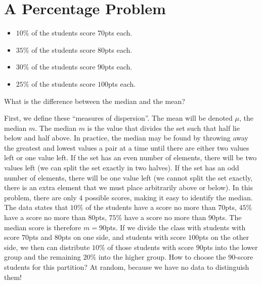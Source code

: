 \documentclass[12pt]{article}
\begin{document}
\section{A Percentage Problem}
\begin{itemize}
\item $10\%$ of the students score $70$pts each. 
\item $35\%$ of the students score $80$pts each. 
\item $30\%$ of the students score $90$pts each. 
\item $25\%$ of the students score $100$pts each. 
\end{itemize}
What is the difference between the median and the mean?

\begin{answer}
First, we define these ``measures of dispersion''. The mean will be denoted $\mu$, the median $m$. 
The median $m$ is the value that divides the set such that half lie below and half above. In practice, the median may be found by throwing away the greatest and lowest values a pair at a time until there are either two values left or one value left. If the set has an even number of elements, there will be two values left (we can split the set exactly in two halves). If the set has an odd number of elements, there will be one value left (we cannot split the set exactly, there is an extra element that we must place arbitrarily above or below). In this problem, there are only $4$ possible scores, making it easy to identify the median. The data states that $10\%$ of the students have a score no more than $70$pts, $45\%$ have a score no more than $80$pts, $75\%$ have a score no more than $90$pts. The median score is therefore $m=90$pts. If we divide the class with students with score $70$pts and $80$pts on one side, and students with score $100$pts on the other side, we then can distribute $10\%$ of those students with score $90$pts into the lower group and the remaining $20\%$ into the higher group. How to choose the $90$-score students for this partition? At random, because we have no data to distinguish them! 


\end{answer}
\end{document}
